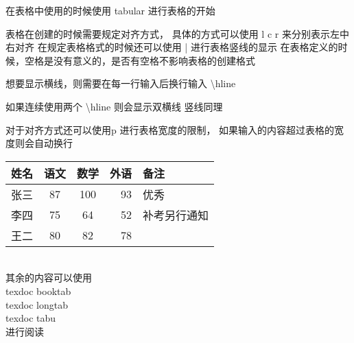 \documentclass{ctexart}
\begin{document}
在表格中使用的时候使用 tabular 进行表格的开始

表格在创建的时候需要规定对齐方式，
具体的方式可以使用 l c r 来分别表示左中右对齐
在规定表格格式的时候还可以使用 | 进行表格竖线的显示
在表格定义的时候，空格是没有意义的，是否有空格不影响表格的创建格式

想要显示横线，则需要在每一行输入后换行输入 \textbackslash hline

如果连续使用两个 \textbackslash hline 则会显示双横线
竖线同理

对于对齐方式还可以使用\enspace p{} 进行表格宽度的限制，
如果输入的内容超过表格的宽度则会自动换行

    \begin{tabular}{| l || c | c  r  p{1.5cm}}
        姓名 & 语文 & 数学 & 外语 & 备注 \\
        \hline
        张三 & 87 & 100 & 93 & 优秀 \\
        \hline \hline
        李四 & 75 & 64 & 52 & 补考另行通知 \\
        王二 & 80 & 82 & 78 & \\
    \end{tabular}\\
其余的内容可以使用\\
\enspace texdoc booktab\enspace \\
\enspace texdoc longtab\enspace \\
\enspace texdoc tabu\enspace \\
进行阅读
\end{document}

